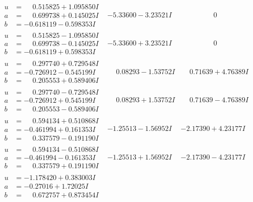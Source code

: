 \documentclass[1p]{elsarticle_modified}
\theoremstyle{definition}
\begin{document}
$$\begin{array}{c|c|c}
\begin{aligned}
u &= \phantom{-}0.515825 + 1.095850 I \\
a &= \phantom{-}0.699738 + 0.145025 I \\
b &= -0.618119 - 0.598353 I\end{aligned}
 & -5.33600 - 3.23521 I & \phantom{-0.000000 } 0 \\ \hline\begin{aligned}
u &= \phantom{-}0.515825 - 1.095850 I \\
a &= \phantom{-}0.699738 - 0.145025 I \\
b &= -0.618119 + 0.598353 I\end{aligned}
 & -5.33600 + 3.23521 I & \phantom{-0.000000 } 0 \\ \hline\begin{aligned}
u &= \phantom{-}0.297740 + 0.729548 I \\
a &= -0.726912 - 0.545199 I \\
b &= \phantom{-}0.205553 + 0.589406 I\end{aligned}
 & \phantom{-}0.08293 - 1.53752 I & \phantom{-}0.71639 + 4.76389 I \\ \hline\begin{aligned}
u &= \phantom{-}0.297740 - 0.729548 I \\
a &= -0.726912 + 0.545199 I \\
b &= \phantom{-}0.205553 - 0.589406 I\end{aligned}
 & \phantom{-}0.08293 + 1.53752 I & \phantom{-}0.71639 - 4.76389 I \\ \hline\begin{aligned}
u &= \phantom{-}0.594134 + 0.510868 I \\
a &= -0.461994 + 0.161353 I \\
b &= \phantom{-}0.337579 - 0.191190 I\end{aligned}
 & -1.25513 - 1.56952 I & -2.17390 + 4.23177 I \\ \hline\begin{aligned}
u &= \phantom{-}0.594134 - 0.510868 I \\
a &= -0.461994 - 0.161353 I \\
b &= \phantom{-}0.337579 + 0.191190 I\end{aligned}
 & -1.25513 + 1.56952 I & -2.17390 - 4.23177 I \\ \hline\begin{aligned}
u &= -1.178420 + 0.383003 I \\
a &= -0.27016 + 1.72025 I \\
b &= \phantom{-}0.672757 + 0.873454 I\end{aligned}

\end{array}$$
\end{document}
